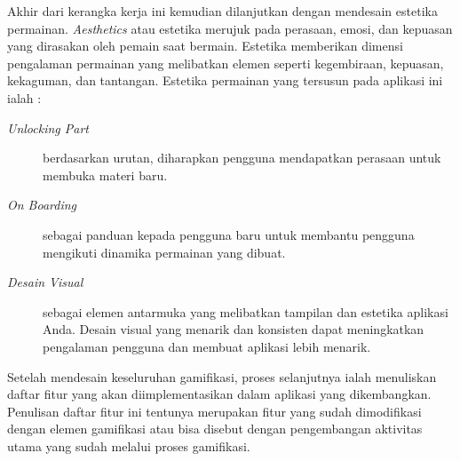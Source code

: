 Akhir dari kerangka kerja ini kemudian dilanjutkan dengan mendesain estetika permainan. \textit{Aesthetics} atau estetika merujuk pada perasaan, emosi, dan kepuasan yang dirasakan oleh pemain saat bermain. Estetika memberikan dimensi pengalaman permainan yang melibatkan elemen seperti kegembiraan, kepuasan, kekaguman, dan tantangan. Estetika permainan yang tersusun pada aplikasi ini ialah : 
\begin{description}
	\item [\textit{Unlocking Part}] berdasarkan urutan, diharapkan pengguna mendapatkan perasaan untuk membuka materi baru.
	\item [\textit{On Boarding}] sebagai panduan kepada pengguna baru untuk membantu pengguna mengikuti dinamika permainan yang dibuat.
	\item [\textit{Desain Visual}] sebagai elemen antarmuka yang melibatkan tampilan dan estetika aplikasi Anda. Desain visual yang menarik dan konsisten dapat meningkatkan pengalaman pengguna dan membuat aplikasi lebih menarik.
\end{description}
Setelah mendesain keseluruhan gamifikasi, proses selanjutnya ialah menuliskan daftar fitur yang akan diimplementasikan dalam aplikasi yang dikembangkan.
Penulisan daftar fitur ini tentunya merupakan fitur yang sudah dimodifikasi dengan elemen gamifikasi 
atau bisa disebut dengan pengembangan aktivitas utama yang sudah melalui proses gamifikasi.
\newpage
